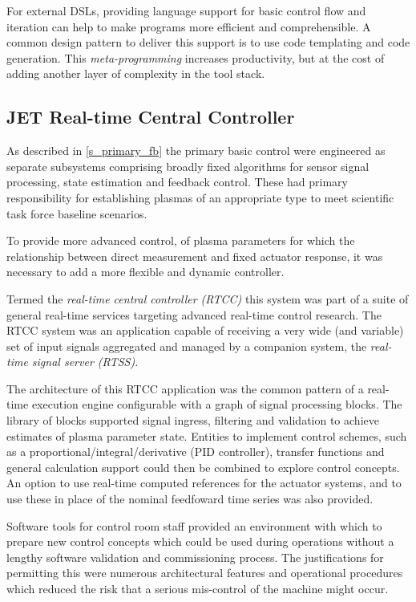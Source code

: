 \documentclass[preprint,12pt]{elsarticle}
\begin{document}
For external DSLs, providing language support for basic control flow and iteration
can help to make programs more efficient and comprehensible.  A common design pattern
to deliver this support is to use code templating and code generation.  This
{\em meta-programming} increases productivity, but at the cost of adding another
layer of complexity in the tool stack.


\subsection{JET Real-time Central Controller}
\label{s_rtcc}

As described in \ref{s_primary_fb} the primary basic control were
engineered as separate subsystems comprising broadly fixed algorithms
for sensor signal processing, state estimation and feedback control.
These had primary responsibility for establishing plasmas of an
appropriate type to meet scientific task force baseline scenarios.

To provide more advanced control, of plasma parameters for which the
relationship between direct measurement and fixed actuator response, 
it was necessary to add a more flexible and dynamic controller.

Termed the {\em real-time central controller (RTCC)} this system was
part of a suite of general real-time services targeting advanced
real-time control research.  The RTCC system was an application 
capable of receiving a very wide (and variable) set of input signals
aggregated and managed by a companion system, the {\em real-time signal server (RTSS)}.

The architecture of this RTCC application was the common pattern of
a real-time execution engine configurable with a graph of signal
processing blocks.  The library of blocks supported signal ingress,
filtering and validation to achieve estimates of plasma parameter
state.  Entities to implement control schemes, such as a proportional/integral/derivative
(PID controller), transfer functions and general calculation support
could then be combined to explore control concepts.  An option to
use real-time computed references for the actuator systems, and to 
use these in place of the nominal feedfoward time series was also
provided.

Software tools for control room staff provided an environment with
which to prepare new control concepts which could be used during operations
without a lengthy software validation and commissioning process.
The justifications for permitting this were numerous architectural
features and operational procedures which reduced the risk that a 
serious mis-control of the machine might occur.
\end{document}

